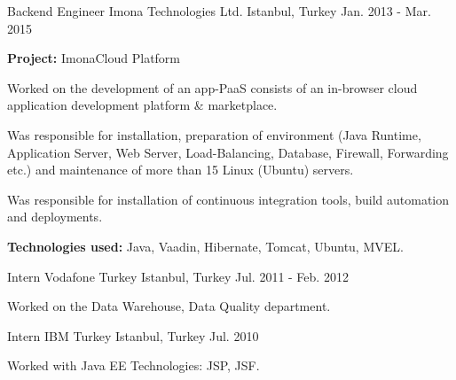 \begin{cventries}
    \cventry
    {Backend Engineer}
    {Imona Technologies Ltd.}
    {Istanbul, Turkey}
    {Jan. 2013 - Mar. 2015}
    {
    \begin{cvitems}
        \item {\textbf{Project:} ImonaCloud Platform}
        \item {Worked on the development of an app-PaaS consists of an in-browser
        cloud application development platform \& marketplace.}
        \item{Was responsible for installation, preparation of environment (Java Runtime, Application Server,
        Web Server, Load-Balancing, Database, Firewall, Forwarding etc.) and
        maintenance of more than 15 Linux (Ubuntu) servers.}
        \item{Was responsible for installation of continuous integration tools, build automation and deployments.}
        \smallskip
        \item {\textbf{Technologies used:} Java, Vaadin, Hibernate, Tomcat, Ubuntu, MVEL.}
    \end{cvitems}
    }

    \cventry
    {Intern}
    {Vodafone Turkey}
    {Istanbul, Turkey}
    {Jul. 2011 - Feb. 2012}
    {
    \begin{cvitems}
        \item {Worked on the Data Warehouse, Data Quality department.}
    \end{cvitems}
    }

    \cventry
    {Intern}
    {IBM Turkey}
    {Istanbul, Turkey}
    {Jul. 2010}
    {
    \begin{cvitems}
        \item {Worked with Java EE Technologies: JSP, JSF.}
    \end{cvitems}
    }

\end{cventries}
